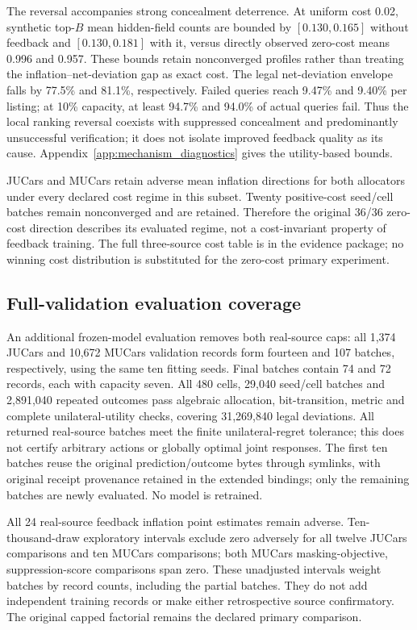 \documentclass[11pt]{article}
\begin{document}
The reversal accompanies strong concealment deterrence. At uniform cost
0.02, synthetic top-$B$ mean hidden-field counts are bounded by
$[0.130,0.165]$ without feedback and $[0.130,0.181]$ with it, versus directly
observed zero-cost means 0.996 and 0.957. These bounds retain nonconverged
profiles rather than treating the inflation--net-deviation gap as exact cost.
The legal net-deviation envelope falls by 77.5\% and 81.1\%, respectively.
Failed queries reach 9.47\% and 9.40\% per listing; at 10\% capacity, at least
94.7\% and 94.0\% of actual queries fail. Thus the local ranking reversal
coexists with suppressed concealment and predominantly unsuccessful
verification; it does not isolate improved feedback quality as its cause.
Appendix~\ref{app:mechanism_diagnostics} gives the utility-based bounds.

JUCars and MUCars retain adverse mean inflation directions for both allocators
under every declared cost regime in this subset. Twenty positive-cost
seed/cell batches remain nonconverged and are retained. Therefore the original
36/36 zero-cost direction describes its evaluated regime, not a cost-invariant
property of feedback training. The full three-source cost table is in the
evidence package; no winning cost distribution is substituted for the zero-cost
primary experiment.

\subsection{Full-validation evaluation coverage}\label{sec:full_validation}
An additional frozen-model evaluation removes both real-source caps: all
1,374 JUCars and 10,672 MUCars validation records form fourteen and 107 batches,
respectively, using the same ten fitting seeds. Final batches contain 74 and
72 records, each with capacity seven. All 480 cells, 29,040 seed/cell batches
and 2,891,040 repeated outcomes pass algebraic allocation, bit-transition,
metric and complete unilateral-utility checks, covering 31,269,840 legal
deviations. All returned real-source batches meet the finite unilateral-regret
tolerance; this does not certify arbitrary actions or globally optimal joint
responses. The first ten batches reuse the original prediction/outcome bytes
through symlinks, with original receipt provenance retained in the extended
bindings; only the remaining batches are newly evaluated. No model is retrained.

All 24 real-source feedback inflation point estimates remain adverse.
Ten-thousand-draw exploratory intervals exclude zero adversely for all twelve
JUCars comparisons and ten MUCars comparisons; both MUCars masking-objective,
suppression-score comparisons span zero. These unadjusted intervals weight
batches by record counts, including the partial batches. They do not add
independent training records or make either retrospective source confirmatory.
The original capped factorial remains the declared primary comparison.
\end{document}
